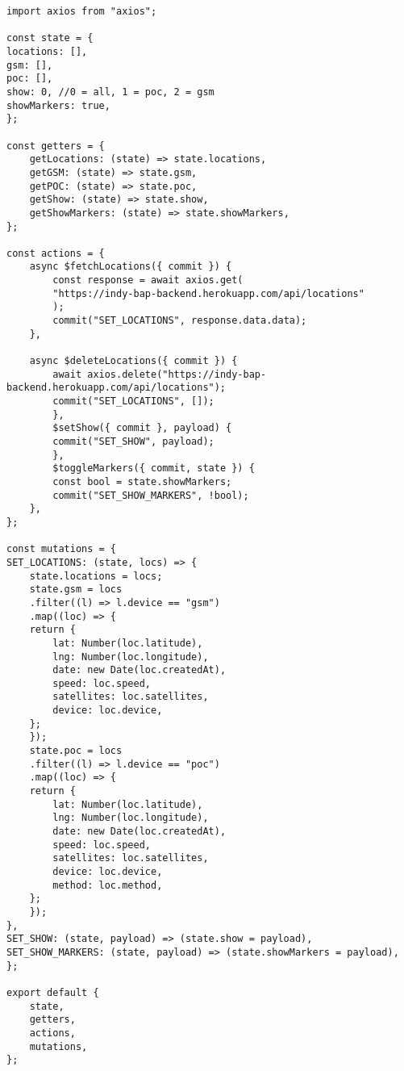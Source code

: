 \begin{lstlisting}
import axios from "axios";

const state = {
locations: [],
gsm: [],
poc: [],
show: 0, //0 = all, 1 = poc, 2 = gsm
showMarkers: true,
};

const getters = {
	getLocations: (state) => state.locations,
	getGSM: (state) => state.gsm,
	getPOC: (state) => state.poc,
	getShow: (state) => state.show,
	getShowMarkers: (state) => state.showMarkers,
};

const actions = {
	async $fetchLocations({ commit }) {
		const response = await axios.get(
		"https://indy-bap-backend.herokuapp.com/api/locations"
		);
		commit("SET_LOCATIONS", response.data.data);
	},
	
	async $deleteLocations({ commit }) {
		await axios.delete("https://indy-bap-backend.herokuapp.com/api/locations");
		commit("SET_LOCATIONS", []);
		},
		$setShow({ commit }, payload) {
		commit("SET_SHOW", payload);
		},
		$toggleMarkers({ commit, state }) {
		const bool = state.showMarkers;
		commit("SET_SHOW_MARKERS", !bool);
	},
};

const mutations = {
SET_LOCATIONS: (state, locs) => {
	state.locations = locs;
	state.gsm = locs
	.filter((l) => l.device == "gsm")
	.map((loc) => {
	return {
		lat: Number(loc.latitude),
		lng: Number(loc.longitude),
		date: new Date(loc.createdAt),
		speed: loc.speed,
		satellites: loc.satellites,
		device: loc.device,
	};
	});
	state.poc = locs
	.filter((l) => l.device == "poc")
	.map((loc) => {
	return {
		lat: Number(loc.latitude),
		lng: Number(loc.longitude),
		date: new Date(loc.createdAt),
		speed: loc.speed,
		satellites: loc.satellites,
		device: loc.device,
		method: loc.method,
	};
	});
},
SET_SHOW: (state, payload) => (state.show = payload),
SET_SHOW_MARKERS: (state, payload) => (state.showMarkers = payload),
};

export default {
	state,
	getters,
	actions,
	mutations,
};
\end{lstlisting}